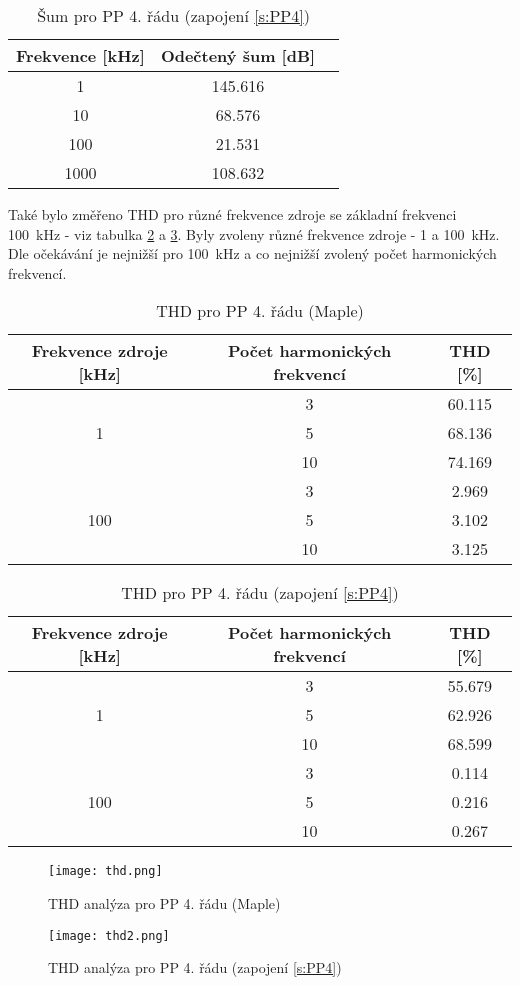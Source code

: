   \begin{table}[h]
\centering
  \begin{tabular}{ | c | c | c |}
    \hline
     Frekvence [kHz] & Odečtený šum [dB] \\ \hline
    1 & 145.616 \\ \hline
    10 & 68.576 \\ \hline
    100 & 21.531 \\ \hline
    1000 & 108.632 \\ \hline
  \end{tabular}
\caption[Šum pro PP 4. řádu]{Šum pro PP 4. řádu (zapojení \ref{s:PP4}) \label{s:THD2}}
\end{table}
\noindent Také bylo změřeno THD pro různé frekvence zdroje se základní frekvenci 100~kHz - viz tabulka \ref{s:THD3} a \ref{s:THD4}. Byly zvoleny různé frekvence zdroje - 1 a 100~kHz. Dle očekávání je nejnižší pro 100~kHz a co nejnižší zvolený počet harmonických frekvencí.
\begin{table}[h]
\centering
\renewcommand{\arraystretch}{1.15}
  \begin{tabular}{ | c | c | c |}
    \hline
    Frekvence zdroje [kHz] & Počet harmonických frekvencí & THD [\%] \\ \hline
    \multirow{3}{*}{1} & 3 & 60.115 \\& 5 & 68.136 \\& 10 & 74.169 \\ \hline
	\multirow{3}{*}{100} & 3 & 2.969\\& 5 & 3.102 \\& 10 & 3.125 \\ \hline
  \end{tabular}
  \caption[THD pro PP 4. řádu (Maple)]{THD pro PP 4. řádu (Maple) \label{s:THD3}}
\end{table}
\begin{table}[h]
\centering
\renewcommand{\arraystretch}{1.15}
  \begin{tabular}{ | c | c | c |} 
    \hline
     Frekvence zdroje [kHz] & Počet harmonických frekvencí & THD [\%] \\ \hline
    \multirow{3}{*}{1} & 3 & 55.679 \\& 5 & 62.926 \\& 10 & 68.599 \\ \hline
	\multirow{3}{*}{100} & 3 & 0.114\\& 5 & 0.216 \\& 10 & 0.267 \\ \hline
  \end{tabular}
  \caption[THD pro PP 4. řádu]{THD pro PP 4. řádu (zapojení \ref{s:PP4}) \label{s:THD4}}
\end{table}
\begin{figure}[h]
\centering
\texttt{[image: thd.png]}
\caption[THD analýza pro PP 4. řádu (Maple)]{THD analýza pro PP 4. řádu (Maple)}
\end{figure}
\begin{figure}[h]
\centering
\texttt{[image: thd2.png]}
\caption[THD analýza pro PP 4. řádu (zapojení \ref{s:PP4})]{THD analýza pro PP 4. řádu (zapojení \ref{s:PP4})}
\end{figure}